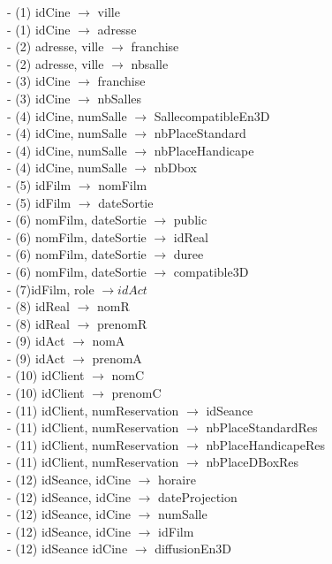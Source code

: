 \documentclass[a4paper,sffamily,12pt]{article}
\begin{document}
				\noindent- (1) idCine $\rightarrow$ ville \\
				- (1) idCine $\rightarrow$ adresse \\
				- (2) adresse, ville $\rightarrow$ franchise \\
				- (2) adresse, ville $\rightarrow$ nbsalle \\
				- (3) idCine $\rightarrow$ franchise \\
				- (3) idCine $\rightarrow$ nbSalles \\
				- (4) idCine, numSalle $\rightarrow$ SallecompatibleEn3D \\
		 		- (4) idCine, numSalle $\rightarrow$ nbPlaceStandard \\
		 		- (4) idCine, numSalle $\rightarrow$ nbPlaceHandicape \\
		 		- (4) idCine, numSalle $\rightarrow$ nbDbox \\
		 		- (5) idFilm $\rightarrow$ nomFilm \\
		 		- (5) idFilm $\rightarrow$ dateSortie \\				 		
				- (6) nomFilm, dateSortie $\rightarrow$ public \\
				- (6) nomFilm, dateSortie $\rightarrow$ idReal \\
				- (6) nomFilm, dateSortie $\rightarrow$ duree \\
				- (6) nomFilm, dateSortie $\rightarrow$ compatible3D \\
				- (7)idFilm, role $\rightarrow idAct$ \\
				- (8) idReal $\rightarrow$ nomR \\
				- (8) idReal $\rightarrow$ prenomR \\						
				- (9) idAct $\rightarrow$ nomA \\
				- (9) idAct $\rightarrow$ prenomA \\						
				- (10) idClient $\rightarrow$ nomC \\
				- (10) idClient $\rightarrow$ prenomC \\						
				- (11) idClient, numReservation $\rightarrow$ idSeance \\
				- (11) idClient, numReservation $\rightarrow$ nbPlaceStandardRes \\
				- (11) idClient, numReservation $\rightarrow$ nbPlaceHandicapeRes \\
				- (11) idClient, numReservation $\rightarrow$ nbPlaceDBoxRes \\
				- (12) idSeance, idCine $\rightarrow$ horaire \\
				- (12) idSeance, idCine $\rightarrow$ dateProjection \\
				- (12) idSeance, idCine $\rightarrow$ numSalle \\
				- (12) idSeance, idCine $\rightarrow$ idFilm \\
				- (12) idSeance  idCine $\rightarrow$ diffusionEn3D \\
		
\end{document}
